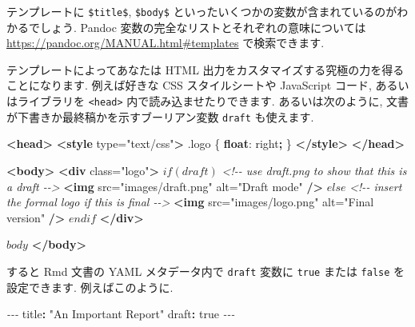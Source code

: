 \documentclass[
  11pt,
  lualatex,ja=standard,jafont=noto]{bxjsreport}
\newenvironment{Shaded}{\begin{snugshade}}{\end{snugshade}}
\newcommand{\AttributeTok}[1]{\textcolor[rgb]{0.77,0.63,0.00}{#1}}
\newcommand{\CharTok}[1]{\textcolor[rgb]{0.31,0.60,0.02}{#1}}
\newcommand{\CommentTok}[1]{\textcolor[rgb]{0.56,0.35,0.01}{\textit{#1}}}
\newcommand{\DecValTok}[1]{\textcolor[rgb]{0.00,0.00,0.81}{#1}}
\newcommand{\FunctionTok}[1]{\textcolor[rgb]{0.00,0.00,0.00}{#1}}
\newcommand{\KeywordTok}[1]{\textcolor[rgb]{0.13,0.29,0.53}{\textbf{#1}}}
\newcommand{\NormalTok}[1]{#1}
\newcommand{\OperatorTok}[1]{\textcolor[rgb]{0.81,0.36,0.00}{\textbf{#1}}}
\newcommand{\OtherTok}[1]{\textcolor[rgb]{0.56,0.35,0.01}{#1}}
\newcommand{\PreprocessorTok}[1]{\textcolor[rgb]{0.56,0.35,0.01}{\textit{#1}}}
\newcommand{\StringTok}[1]{\textcolor[rgb]{0.31,0.60,0.02}{#1}}
\begin{document}
テンプレートに \texttt{\$title\$}, \texttt{\$body\$} といったいくつかの変数が含まれているのがわかるでしょう. Pandoc 変数の完全なリストとそれぞれの意味については \url{https://pandoc.org/MANUAL.html\#templates} で検索できます.

テンプレートによってあなたは HTML 出力をカスタマイズする究極の力を得ることになります. 例えば好きな CSS スタイルシートや JavaScript コード, あるいはライブラリを \texttt{\textless{}head\textgreater{}} 内で読み込ませたりできます. あるいは次のように, 文書が下書きか最終稿かを示すブーリアン変数 \texttt{draft} も使えます.

\begin{Shaded}
\begin{Highlighting}[]
\KeywordTok{\textless{}head\textgreater{}}
\KeywordTok{\textless{}style}\OtherTok{ type=}\StringTok{"text/css"}\KeywordTok{\textgreater{}}
\FunctionTok{.logo}\NormalTok{ \{}
  \KeywordTok{float}\NormalTok{: }\DecValTok{right}\OperatorTok{;}
\NormalTok{\}}
\KeywordTok{\textless{}/style\textgreater{}}
\KeywordTok{\textless{}/head\textgreater{}}

\KeywordTok{\textless{}body\textgreater{}}
\KeywordTok{\textless{}div}\OtherTok{ class=}\StringTok{"logo"}\KeywordTok{\textgreater{}}
\NormalTok{$if(draft)$}
\CommentTok{\textless{}!{-}{-} use draft.png to show that this is a draft {-}{-}\textgreater{}}
\KeywordTok{\textless{}img}\OtherTok{ src=}\StringTok{"images/draft.png"}\OtherTok{ alt=}\StringTok{"Draft mode"} \KeywordTok{/\textgreater{}}
\NormalTok{$else$}
\CommentTok{\textless{}!{-}{-} insert the formal logo if this is final {-}{-}\textgreater{}}
\KeywordTok{\textless{}img}\OtherTok{ src=}\StringTok{"images/logo.png"}\OtherTok{ alt=}\StringTok{"Final version"} \KeywordTok{/\textgreater{}}
\NormalTok{$endif$}
\KeywordTok{\textless{}/div\textgreater{}}

\NormalTok{$body$}
\KeywordTok{\textless{}/body\textgreater{}}
\end{Highlighting}
\end{Shaded}

すると Rmd 文書の YAML メタデータ内で \texttt{draft} 変数に \texttt{true} または \texttt{false} を設定できます. 例えばこのように.

\begin{Shaded}
\begin{Highlighting}[]
\PreprocessorTok{{-}{-}{-}}
\FunctionTok{title}\KeywordTok{:}\AttributeTok{ }\StringTok{"An Important Report"}
\FunctionTok{draft}\KeywordTok{:}\AttributeTok{ }\CharTok{true}
\PreprocessorTok{{-}{-}{-}}
\end{Highlighting}
\end{Shaded}
\end{document}
